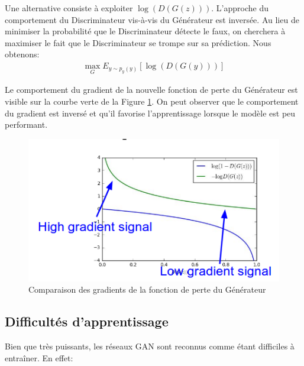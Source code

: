 \noindent Une alternative consiste à exploiter $\log(D(G(z)))$. L'approche du comportement du Discriminateur vis-à-vis du Générateur est inversée. Au lieu de minimiser la probabilité que le Discriminateur détecte le faux, on cherchera à maximiser le fait que le Discriminateur se trompe sur sa prédiction. Nous obtenons:
$$\begin{aligned}
\max_G {E}_{y \sim p_y(y)} [\log(D(G(y)))]
\end{aligned}$$

\noindent Le comportement du gradient de la nouvelle fonction de perte du Générateur est visible sur la courbe verte de la Figure \ref{gangrad}. On peut observer que le comportement du gradient est inversé et qu'il favorise l'apprentissage lorsque le modèle est peu performant.

\noindent

\begin{figure}
    \centering
    \includegraphics[scale=0.4]{./tex/generative-adversarial-network/gangrad.png}
    \caption{Comparaison des gradients de la fonction de perte du Générateur}
    \label{gangrad}
\end{figure}


\subsection{Difficultés d'apprentissage}
Bien que très puissants, les réseaux GAN sont reconnus comme étant difficiles à entraîner. En effet:\\

